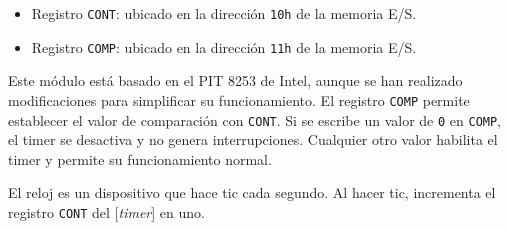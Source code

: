 \documentclass[12pt,oneside]{templates/unerthesis}
\providecommand{\tightlist}{%
  \setlength{\itemsep}{0pt}\setlength{\parskip}{0pt}}
\begin{document}
\begin{itemize}
\tightlist
\item
  Registro \texttt{CONT}: ubicado en la dirección \texttt{10h} de la memoria E/S.
\item
  Registro \texttt{COMP}: ubicado en la dirección \texttt{11h} de la memoria E/S.
\end{itemize}

Este módulo está basado en el PIT 8253 de Intel, aunque se han realizado modificaciones para simplificar su funcionamiento. El registro \texttt{COMP} permite establecer el valor de comparación con \texttt{CONT}. Si se escribe un valor de \texttt{0} en \texttt{COMP}, el timer se desactiva y no genera interrupciones. Cualquier otro valor habilita el timer y permite su funcionamiento normal.

El reloj es un dispositivo que hace tic cada segundo. Al hacer tic, incrementa el registro \texttt{CONT} del {[}\emph{timer}{]} en uno.
\end{document}
